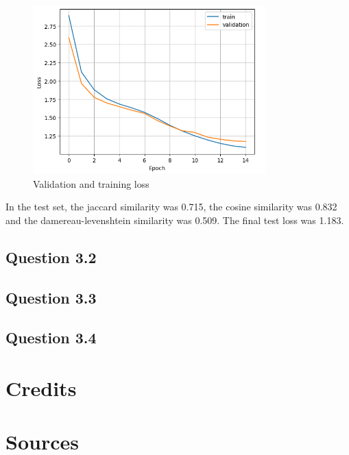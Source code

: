 \documentclass{article}
\begin{document}
\begin{figure}[H]
    \centering
    \includegraphics[width=0.8\textwidth]{../report/plots/RNN-valid-train-loss.png}
    \caption{Validation and training loss}
    \label{fig:valid-train-loss}
\end{figure}


In the test set, the jaccard similarity was 0.715, the cosine similarity was 0.832 and the damereau-levenshtein similarity was 0.509. The final test loss was 1.183.
\subsection{Question 3.2}

\subsection{Question 3.3}

\subsection{Question 3.4}

\section{Credits}

\section{Sources}
\end{document}
